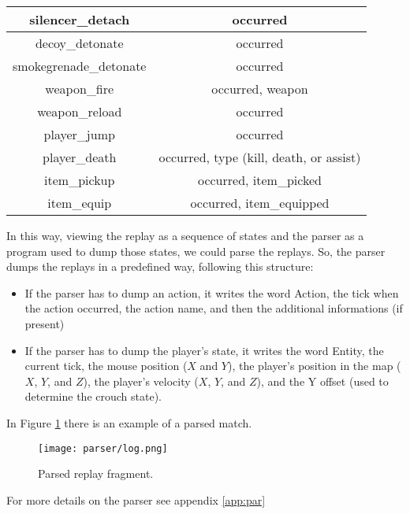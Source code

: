 \begin{table}
\begin{tabular}{|c|c|}
			\hline
			silencer\_detach & occurred \\
			\hline
			decoy\_detonate & occurred \\
			\hline
			smokegrenade\_detonate & occurred \\
			\hline
			weapon\_fire & occurred, weapon \\
			\hline
			weapon\_reload & occurred \\
			\hline
			player\_jump & occurred \\
			\hline
			player\_death & occurred, type (kill, death, or assist)\\
			\hline
			item\_pickup & occurred, item\_picked \\
			\hline
			item\_equip & occurred, item\_equipped\\
			\hline
	
		\end{tabular}
	
	\end{table}

	In this way, viewing the replay as a sequence of states and the parser as a program used to dump those states, we could parse the replays.
	So, the parser dumps the replays in a predefined way, following this structure:
	
	\begin{itemize}
	
		\item If the parser has to dump an action, it writes the word Action, the tick when the action occurred, the action name, and then the additional informations (if present)
		\item If the parser has to dump the player's state, it writes the word Entity, the current tick, the mouse position ($X$ and $Y$), the player's position in the map ($X$, $Y$, and $Z$), 
		the player's velocity ($X$, $Y$, and $Z$), and the Y offset (used to determine the crouch state).
	
	\end{itemize}
	
	In Figure \ref{fig:parsed} there is an example of a parsed match.
	
	\begin{figure}[!h] 
		\centering 
		\texttt{[image: parser/log.png]}
		\caption{\label{fig:parsed}Parsed replay fragment.}
	\end{figure}

	For more details on the parser see appendix \ref{app:par}
